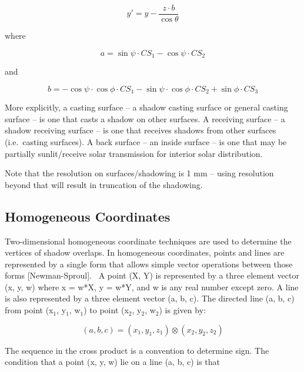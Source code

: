 \begin{equation}
{y'} = y - \frac{{z\cdot b}}{{\cos \theta }}
\end{equation}

where

\begin{equation}
a = \sin \psi \cdot C{S_1} - \cos \psi \cdot C{S_2}
\end{equation}

and

\begin{equation}
b =  - \cos \psi \cdot \cos \phi \cdot C{S_1} - \sin \psi \cdot \cos \phi \cdot C{S_2} + \sin \phi \cdot C{S_3}
\end{equation}

More explicitly, a casting surface -- a shadow casting surface or general casting surface -- is one that casts a shadow on other surfaces. A receiving surface -- a shadow receiving surface -- is one that receives shadows from other surfaces (i.e.~casting surfaces). A back surface -- an inside surface -- is one that may be partially sunlit/receive solar transmission for interior solar distribution.

Note that the resolution on surfaces/shadowing is 1 mm -- using resolution beyond that will result in truncation of the shadowing.

\subsection{Homogeneous Coordinates}\label{homogeneous-coordinates}

Two-dimensional homogeneous coordinate techniques are used to determine the vertices of shadow overlaps. In homogeneous coordinates, points and lines are represented by a single form that allows simple vector operations between those forms {[}Newman-Sproul{]}.~ A point (X, Y) is represented by a three element vector (x, y, w) where x = w*X, y = w*Y, and w is any real number except zero. A line is also represented by a three element vector (a, b, c). The directed line (a, b, c) from point (x\(_{1}\), y\(_{1}\), w\(_{1}\)) to point (x\(_{2}\), y\(_{2}\), w\(_{2}\)) is given by:

\begin{equation}
(a,b,c) = ({x_1},{y_1},{z_1}) \otimes ({x_2},{y_2},{z_2})
\end{equation}

The sequence in the cross product is a convention to determine sign. The condition that a point (x, y, w) lie on a line (a, b, c) is that

